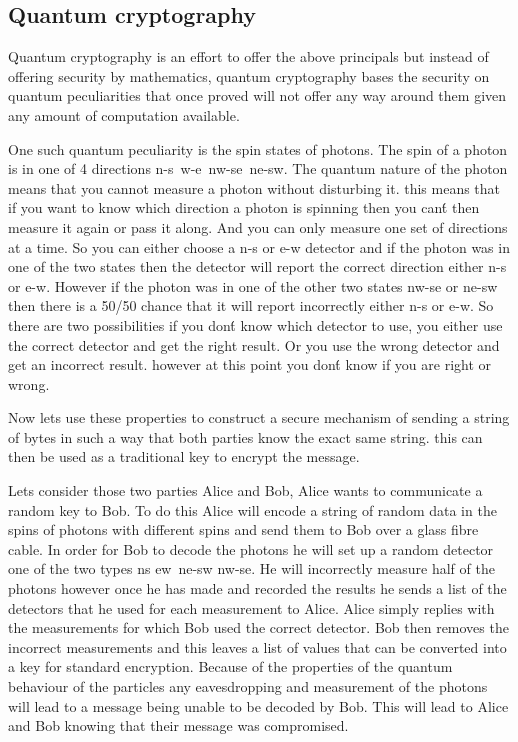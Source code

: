 \documentclass[12pt]{article}
\begin{document}
\subsection{Quantum cryptography}
Quantum cryptography is an effort to offer the above principals but instead
of offering security by mathematics, quantum cryptography bases the security
on quantum peculiarities that once proved will not offer any way
around them given any amount of computation available.

One such quantum peculiarity is the spin states of photons. The spin of
a photon is in one of 4 directions n-s\, w-e\, nw-se\, ne-sw.
The quantum nature of the photon means that you cannot measure a photon
without disturbing it. this means that if you want to know which direction a photon is spinning then you can\'t then measure it again or pass it along. And you can only measure one set of directions at a time. So you can either choose a n-s or e-w detector and if the photon was in one of the two states then the detector will report the correct direction either n-s or e-w. However if the photon was in one of the other two states nw-se or ne-sw then there is a 50/50 chance that it will report incorrectly either n-s or e-w. So there are two possibilities if you don\'t know which detector to use, you either use the correct detector and get the right result. Or you use the wrong detector and get an incorrect result. however at this point you don\'t know if you are right or wrong.

Now lets use these properties to construct a secure mechanism of sending a string of bytes in such a way that both parties know the exact same string. this
can then be used as a traditional key to encrypt the message.

Lets consider those two parties Alice and Bob, Alice wants to communicate a random key to Bob. To do this Alice will encode a string of random data in the 
spins of photons with different spins and send them to Bob over a glass fibre cable. In order for Bob to decode the photons he will set up a random detector 
 one of the two types ns ew\, ne-sw nw-se. He will incorrectly measure half of the photons however once he has made and recorded the results he sends a list of the
detectors that he used for each measurement to Alice. Alice simply replies
with the measurements for which Bob used the correct detector. Bob then 
removes the incorrect measurements and this leaves a list of values that 
can be converted into a key for standard encryption. Because of the properties
of the quantum behaviour of the particles any eavesdropping and measurement
of the photons will lead to a message being unable to be decoded by Bob.
This will lead to Alice and Bob knowing that their message was compromised.
\end{document}
